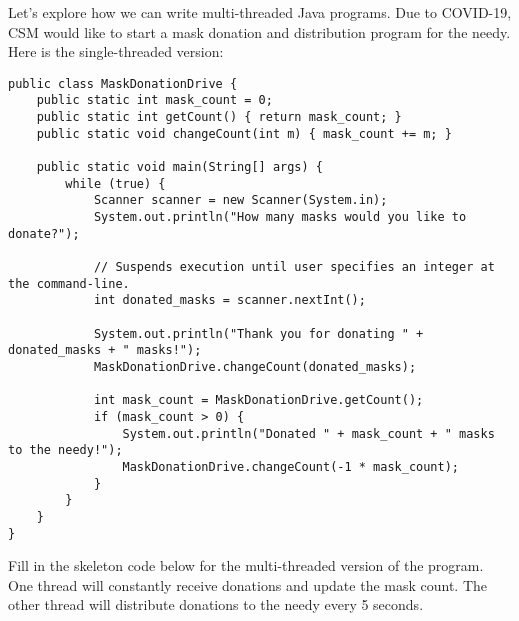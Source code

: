 \question Let's explore how we can write multi-threaded Java programs. Due to COVID-19, CSM would like to start a mask donation and distribution program for the needy. Here is the single-threaded version:
\clearpage

\begin{lstlisting}
public class MaskDonationDrive {
    public static int mask_count = 0;
    public static int getCount() { return mask_count; }
    public static void changeCount(int m) { mask_count += m; }

    public static void main(String[] args) {
        while (true) {
            Scanner scanner = new Scanner(System.in);
            System.out.println("How many masks would you like to donate?");
            
            // Suspends execution until user specifies an integer at the command-line.
            int donated_masks = scanner.nextInt();
            
            System.out.println("Thank you for donating " + donated_masks + " masks!");
            MaskDonationDrive.changeCount(donated_masks);
            
            int mask_count = MaskDonationDrive.getCount();
            if (mask_count > 0) {
                System.out.println("Donated " + mask_count + " masks to the needy!");
                MaskDonationDrive.changeCount(-1 * mask_count);
            }
        }
    }
}
\end{lstlisting}
Fill in the skeleton code below for the multi-threaded version of the program. One thread will constantly receive donations and update the mask count. The other thread will distribute donations to the needy every 5 seconds.
\ifprintanswers\else
